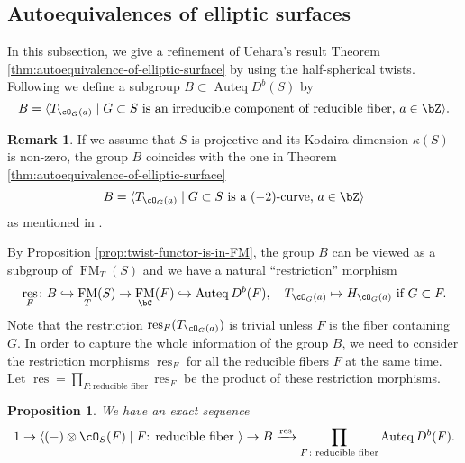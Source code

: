 \documentclass[12pt]{amsart}
\numberwithin{equation}{section}
\theoremstyle{plain}
\newtheorem{proposition}[theorem]{Proposition}
\theoremstyle{definition}
\newtheorem{remark}[theorem]{Remark}
\DeclareMathOperator{\Auteq}{\mathrm{Auteq}}
\DeclareMathOperator{\FM}{\mathrm{FM}}
\DeclareMathOperator{\res}{\mathrm{res}}
\begin{document}
\subsection{Autoequivalences of elliptic surfaces}
In this subsection, we give a refinement of Uehara's result Theorem \ref{thm:autoequivalence-of-elliptic-surface} by using the half-spherical twists.
Following \cite{MR3568337} we define a subgroup $B \subset \Auteq D^b(S)$ by
\begin{equation}
    B = \langle T_{\cO_G(a)} \mid G \subset S \text{ is an irreducible component of reducible fiber, } a \in \bZ\rangle.
\end{equation}


\begin{remark}\label{rem:alternative-description-of-minus-two-curves}
    If we assume that $S$ is projective and its Kodaira dimension $\kappa(S)$ is non-zero, the group $B$ coincides with the one in Theorem \ref{thm:autoequivalence-of-elliptic-surface}
    \begin{equation}
        B = \langle T_{\cO_G(a)} \mid G \subset S \text{ is a $(-2)$-curve, } a \in \bZ\rangle
    \end{equation}
    as mentioned in \cite[Section 3]{MR3568337}.
\end{remark}
By Proposition \ref{prop:twist-functor-is-in-FM}, the group $B$ can be viewed as a subgroup of $\FM_T(S)$ and we have a natural ``restriction'' morphism
\begin{equation}
    \res_F \colon B \hookrightarrow \FM_T(S) \to \FM_{\bC}(F) \hookrightarrow \Auteq D^b(F), \quad T_{\cO_G(a)} \mapsto H_{\cO_G(a)} \text{ if } G \subset F.
\end{equation}
Note that the restriction $\res_F(T_{\cO_G(a)})$ is trivial unless $F$ is the fiber containing $G$.
In order to capture the whole information of the group $B$, we need to consider the restriction morphisms $\res_F$ for all the reducible fibers $F$ at the same time.
Let $\res = \prod_{F \colon \text{reducible fiber}} \res_F$ be the product of these restriction morphisms.
\begin{proposition}\label{prop:kernel-of-res}
    We have an exact sequence
    \begin{equation}
        1 \to \langle (-) \otimes \cO_S(F) \mid F \text{: reducible fiber }\rangle \to B \xrightarrow{\res} \prod_{F \colon \text{reducible fiber}} \Auteq D^b(F).
    \end{equation}
\end{proposition}
\end{document}
